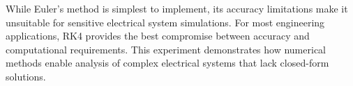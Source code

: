 \documentclass[a4paper,12pt]{article}
\begin{document}
 While Euler's method is simplest to implement, its accuracy limitations make it unsuitable for sensitive electrical system simulations. For most engineering applications, RK4 provides the best compromise between accuracy and computational requirements. This experiment demonstrates how numerical methods enable analysis of complex electrical systems that lack closed-form solutions.
\end{document}
